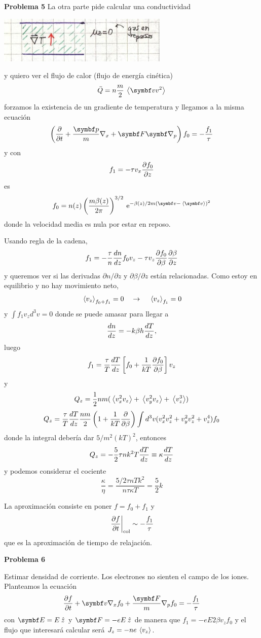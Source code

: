 \documentclass[10pt,oneside]{CBFT_book}
\begin{document}
\begin{ejemplo}{\bf Problema 5}
La otra parte pide calcular una conductividad

\includegraphics[scale=0.5]{images/1606329338.jpg}

y quiero ver el flujo de calor (flujo de energía cinética)
\[
	\bar{Q} = n \frac{m}{2} \vm{ \vbv v^2 }
\]
forzamos la existencia de un gradiente de temperatura y llegamos a la misma ecuación
\[
	\left( \dpar{}{t} + \frac{\vbp}{m} \nabla_x + \vb{F}\Nabla_p \right) f_0 = - \frac{f_1}{\tau}
\]
y con 
\[
	f_1 = - \tau v_x \frac{\partial^{\hspace{-0.05em}} {f_0}}{\partial {z}^{\hspace{-0.05em}}}
\]
es
\[
	f_0 = n(z)\Frac{ m \beta(z) }{ 2 \pi }^{3/2} \euler^{ - \beta(z)/2 m ( \vbv - \vm{\vbv})^2}
\]
donde la velocidad media es nula por estar en reposo.

Usando regla de la cadena,
\[
	f_1 = - \frac{\tau}{n} \frac{d^{\hspace{-0.05em}} {n}}{d {z}^{\hspace{-0.05em}}} f_0 v_z - \tau v_z \frac{\partial^{\hspace{-0.05em}} {f_0}}{\partial {\beta}^{\hspace{-0.05em}}} \frac{\partial^{\hspace{-0.05em}} {\beta}}{\partial {z}^{\hspace{-0.05em}}}
\]
y queremos ver si las derivadas $\partial n/\partial z$ y $\partial \beta / \partial z$ están relacionadas.
Como estoy en equilibrio y no hay movimiento neto,
\[
	\:\left\langle v_z \right\rangle_{f_0+f_1} = 0 \quad \to \quad \:\left\langle v_z \right\rangle_{f_1} = 0
\]
y $\int f_1 v_z d^3v = 0$ donde se puede amasar para llegar a
\[
	\frac{d^{\hspace{-0.05em}} {n}}{d {z}^{\hspace{-0.05em}}} = - k \beta h \frac{d^{\hspace{-0.05em}} {T}}{d {z}^{\hspace{-0.05em}}},
\]
luego
\[
	f_1 = \frac{\tau}{T} \frac{d^{\hspace{-0.05em}} {T}}{d {z}^{\hspace{-0.05em}}} \left[ f_0 + \frac{1}{kT}\frac{\partial^{\hspace{-0.05em}} {f_0}}{\partial {\beta}^{\hspace{-0.05em}}} \right] v_z
\] 
y
\[
	Q_z = \frac{1}{2} n m ( \:\left\langle  v^2_x v_z  \right\rangle + \:\left\langle  v^2_y v_z  \right\rangle + \:\left\langle  v_z^3  \right\rangle )
\]
\[
	Q_z = \frac{\tau}{T} \frac{d^{\hspace{-0.05em}} {T}}{d {z}^{\hspace{-0.05em}}} \frac{ n m }{2} \left( 1 + \frac{1}{kT}\frac{\partial^{\hspace{-0.05em}} {}}{\partial {\beta}^{\hspace{-0.05em}}} \right)
	\int d^3v ( v_x^2 v_z^2 + v_y^2 v_z^2 + v_z^4 ) f_0
\]
donde la integral debería dar $ 5 /m^2 (kT)^2$, entonces
\[
	Q_z = - \frac{5}{2}  \tau n k^2 T  \frac{d^{\hspace{-0.05em}} {T}}{d {z}^{\hspace{-0.05em}}} \equiv \kappa \frac{d^{\hspace{-0.05em}} {T}}{d {z}^{\hspace{-0.05em}}}
\]
y podemos considerar el cociente
\[
	\frac{\kappa}{\eta} = \frac{ 5/2 \tau n T k^2 }{ n \tau \kappa T } = \frac{5}{2}k
\]

La aproximación consiste en poner $f=f_0 +f_1$ y 
\[
	\left.\frac{\partial^{\hspace{-0.05em}} {f}}{\partial {t}^{\hspace{-0.05em}}}\right|_{\text{col}} \sim - \frac{f_1}{\tau}
\]
que es la aproximación de tiempo de relajación.
 
\end{ejemplo}

\begin{ejemplo}{\bf Problema 6}

Estimar densidad de corriente. Los electrones no sienten el campo de los iones.
Planteamos la ecuación 
\[
	\dpar{f}{t} + \vbv \nabla_x f_0 + \frac{\vb{F}}{m}\nabla_p f_0 = -\frac{f_1}{\tau}
\]
con $\vb{E}=E\zver$ y $\vb{F}=-eE\zver$ de manera que $f_1 = - e E 2 \beta v_z f_0$
y el flujo que interesará calcular será $J_z = - n e \:\left\langle  v_z  \right\rangle $.


\end{ejemplo}
\end{document}
